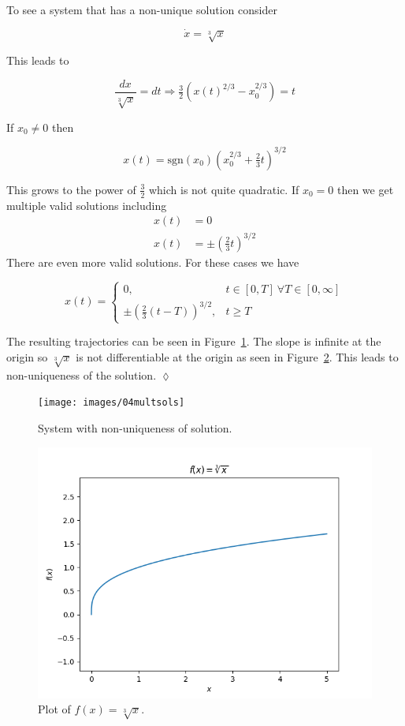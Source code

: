 \begin{example}
To see a system that has a non-unique solution consider

\begin{equation*}
\dot{x} = \sqrt[3]{x}
\end{equation*}

This leads to

\begin{equation*}
\frac{dx}{\sqrt[3]{x}} = dt \Rightarrow \tfrac{3}{2}\left(x{(t)}^{2/3}-x_0^{2/3}\right) = t
\end{equation*}

If $x_0\neq0$ then

\begin{equation*}
x(t) = \text{sgn}(x_0){\left(x_0^{2/3}+\tfrac{2}{3}t\right)}^{3/2}
\end{equation*}

This grows to the power of $\frac{3}{2}$ which is not quite quadratic.
If $x_0=0$ then we get multiple valid solutions including
\begin{align*}
x(t) &= 0 \\
x(t) &= \pm{(\tfrac{2}{3}t)}^{3/2}
\end{align*}
There are even more valid solutions.
For these cases we have

\begin{equation*}
x(t) = \begin{cases} 0, & t\in[0,T]~\forall T\in[0,\infty] \\ \pm{(\tfrac{2}{3}(t-T))}^{3/2}, & t\geq T \end{cases}
\end{equation*}

The resulting trajectories can be seen in Figure~\ref{fig:04multsols}.
The slope is infinite at the origin so $\sqrt[3]{x}$ is not differentiable at the origin as seen in Figure~\ref{fig:04infslope}.
This leads to non-uniqueness of the solution.
$\lozenge$
\end{example}

\begin{figure}[ht!]
\centering
\texttt{[image: images/04multsols]}
\caption{System with non-uniqueness of solution.}%
\label{fig:04multsols}
\end{figure}

\begin{figure}[ht!]
\centering
\includegraphics[width=.5\textwidth]{images/plotCubeRootX}
\caption{Plot of $f(x) = \sqrt[3]{x}$.}%
\label{fig:04infslope}
\end{figure}

